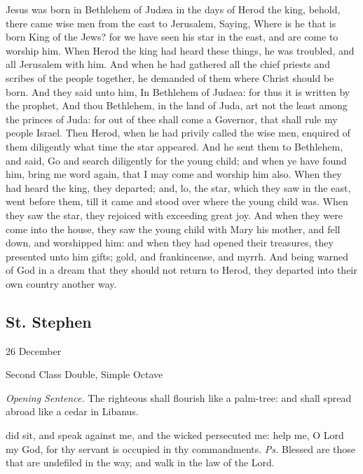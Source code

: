  Jesus was born in Bethlehem of Jud{\ae}a in the days of Herod the king, behold, there came wise men from the east to Jerusalem, Saying, Where is he that is born King of the Jews? for we have seen his star in the east, and are come to worship him. When Herod the king had heard these things, he was troubled, and all Jerusalem with him. And when he had gathered all the chief priests and scribes of the people together, he demanded of them where Christ should be born. And they said unto him, In Bethlehem of Judaea: for thus it is written by the prophet, And thou Bethlehem, in the land of Juda, art not the least among the princes of Juda: for out of thee shall come a Governor, that shall rule my people Israel. Then Herod, when he had privily called the wise men, enquired of them diligently what time the star appeared. And he sent them to Bethlehem, and said, Go and search diligently for the young child; and when ye have found him, bring me word again, that I may come and worship him also. When they had heard the king, they departed; and, lo, the star, which they saw in the east, went before them, till it came and stood over where the young child was. When they saw the star, they rejoiced with exceeding great joy. And when they were come into the house, they saw the young child with Mary his mother, and fell down, and worshipped him: and when they had opened their treasures, they presented unto him gifts; gold, and frankincense, and myrrh. And being warned of God in a dream that they should not return to Herod, they departed into their own country another way.


\clearpage
\subsection{St. Stephen}

\begin{inhead}
{26 December}\par
{Second Class Double, Simple Octave}
\end{inhead}
\par\noindent
\textit{Opening Sentence.} The righteous shall flourish like a palm-tree: and shall spread abroad like a cedar in Libanus.


\introit
{} did sit, and speak against me, and the wicked persecuted me: help me, O Lord my God, for thy servant is occupied in thy commandments. \textit{Ps.} Blessed are those that are undefiled in the way, and walk in the law of the Lord.

